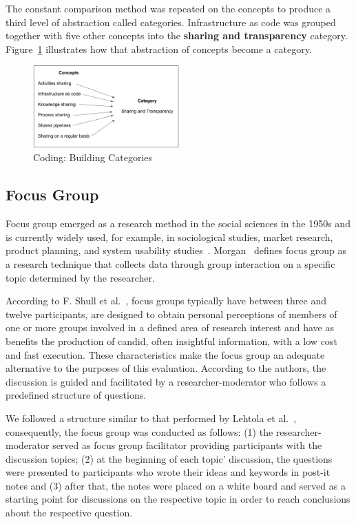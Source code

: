 The constant comparison method was repeated on the concepts to produce a third
level of abstraction called categories. Infrastructure as code was grouped
together with five other concepts into the \textbf{sharing and transparency} category.
Figure~\ref{fig1} illustrates how that abstraction of concepts become a category.


\begin{figure}
  \centering
  \includegraphics[width=0.5\textwidth]{fig1.png}
  \caption{Coding: Building Categories}
  \label{fig1}
\end{figure}


\subsection{Focus Group}
Focus group emerged as a research method in the social sciences in the 1950s
and is currently widely used, for example, in sociological studies, market
research, product planning, and system usability studies~\cite{shull2007guide}.
Morgan~\cite{morgan1996focus} defines focus group as a research technique that
collects data through group interaction on a specific topic determined by the
researcher.

According to F. Shull et al.~\cite{shull2007guide}, focus groups typically have
between three and twelve participants, are designed to obtain personal
perceptions of members of one or more groups involved in a defined area of
research interest and have as benefits the production of candid, often
insightful information, with a low cost and fast execution. These
characteristics make the focus group an adequate alternative to the purposes
of this evaluation. According to the authors, the discussion is guided and
facilitated by a researcher-moderator who follows a predefined structure of
questions.

We followed a structure similar to that performed by Lehtola et al.~\cite{requirementes_priorization_in_practice},
consequently, the focus group was conducted as follows: (1) the researcher-moderator served as
focus group facilitator providing participants with the discussion topics;
(2) at the beginning of each topic' discussion, the
questions were presented to participants who wrote their ideas and keywords in
post-it notes and (3) after that, the notes were placed on a white board and served
as a starting point for discussions on the respective topic in order to reach
conclusions about the respective question.
